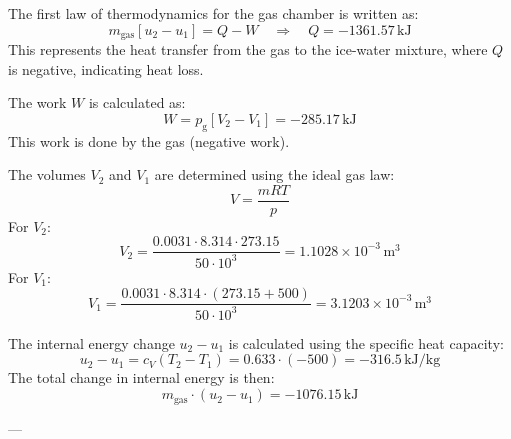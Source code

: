 The first law of thermodynamics for the gas chamber is written as:  
\[
m_{\text{gas}} [u_2 - u_1] = Q - W \quad \Rightarrow \quad Q = -1361.57 \, \text{kJ}
\]  
This represents the heat transfer from the gas to the ice-water mixture, where \( Q \) is negative, indicating heat loss.

The work \( W \) is calculated as:  
\[
W = p_{\text{g}} \left[ V_2 - V_1 \right] = -285.17 \, \text{kJ}
\]  
This work is done by the gas (negative work).

The volumes \( V_2 \) and \( V_1 \) are determined using the ideal gas law:  
\[
V = \frac{m R T}{p}
\]  
For \( V_2 \):  
\[
V_2 = \frac{0.0031 \cdot 8.314 \cdot 273.15}{50 \cdot 10^3} = 1.1028 \times 10^{-3} \, \text{m}^3
\]  
For \( V_1 \):  
\[
V_1 = \frac{0.0031 \cdot 8.314 \cdot (273.15 + 500)}{50 \cdot 10^3} = 3.1203 \times 10^{-3} \, \text{m}^3
\]

The internal energy change \( u_2 - u_1 \) is calculated using the specific heat capacity:  
\[
u_2 - u_1 = c_V (T_2 - T_1) = 0.633 \cdot (-500) = -316.5 \, \text{kJ/kg}
\]  
The total change in internal energy is then:  
\[
m_{\text{gas}} \cdot (u_2 - u_1) = -1076.15 \, \text{kJ}
\]

---